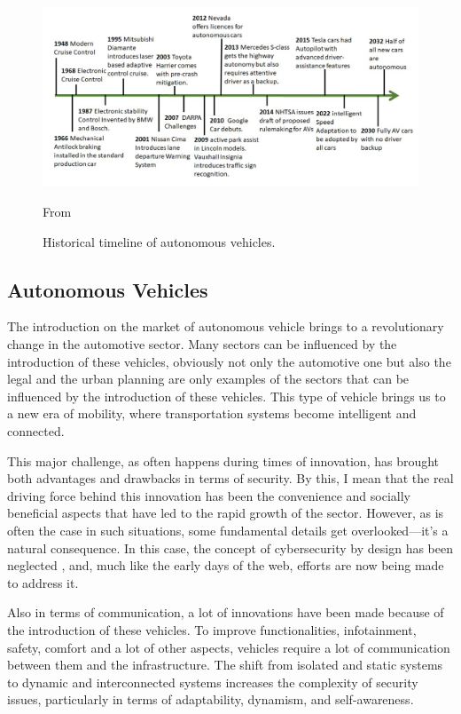 \begin{figure}[!htb]
    \centering
    \includegraphics[width=0.7\linewidth]{figures/history}
    \caption{Historical timeline of autonomous vehicles.}
    \footnotesize{From \cite{ahangar2021survey} }
    \label{fig:history}
\end{figure}

\subsection{Autonomous Vehicles}\label{subsec:autonomous-vehicles}

The introduction on the market of autonomous vehicle brings to a revolutionary change in the automotive sector.
Many sectors can be influenced by the introduction of these vehicles, obviously not only the automotive one but also the legal and the urban planning are only examples of the sectors that can be influenced by the introduction of these vehicles.
This type of vehicle brings us to a new era of mobility, where transportation systems become intelligent and connected.

This major challenge, as often happens during times of innovation, has brought both advantages and drawbacks in terms of security.
By this, I mean that the real driving force behind this innovation has been the convenience and socially beneficial aspects that have led to the rapid growth of the sector.
However, as is often the case in such situations, some fundamental details get overlooked—it's a natural consequence.
In this case, the concept of cybersecurity by design has been neglected \cite{sec-by-design}, and, much like the early days of the web, efforts are now being made to address it.

Also in terms of communication, a lot of innovations have been made because of the introduction of these vehicles.
To improve functionalities, infotainment, safety, comfort and a lot of other aspects, vehicles require a lot of communication between them and the infrastructure.
The shift from isolated and static systems to dynamic and interconnected systems increases the complexity of security issues, particularly in terms of adaptability, dynamism, and self-awareness\cite{connected_vehicles_security_2023, bouchouia2023survey}.

